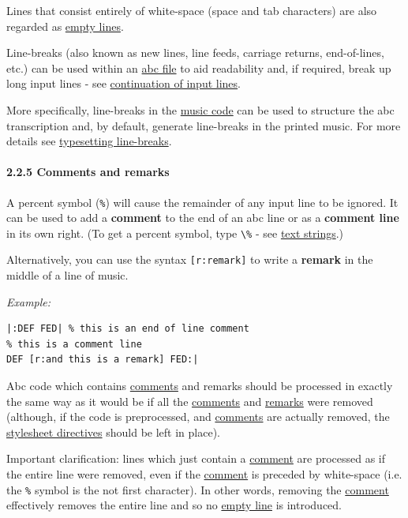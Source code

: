 \documentclass[oneside]{book}
\let\oldparagraph\paragraph
\renewcommand{\paragraph}[1]{\oldparagraph{#1}\mbox{}}
\begin{document}
Lines that consist entirely of white-space (space and tab characters)
are also regarded as \protect\hyperlink{empty_line_definition}{empty
lines}.

Line-breaks (also known as new lines, line feeds, carriage returns,
end-of-lines, etc.) can be used within an
\protect\hyperlink{abc_file_definition}{abc file} to aid readability
and, if required, break up long input lines - see
\protect\hyperlink{continuation_of_input_lines}{continuation of input
lines}.

More specifically, line-breaks in the
\protect\hyperlink{music_code_definition}{music code} can be used to
structure the abc transcription and, by default, generate line-breaks in
the printed music. For more details see
\protect\hyperlink{typesetting_line-breaks}{typesetting line-breaks}.

\hypertarget{comments_and_remarks}{\paragraph{2.2.5 Comments and
remarks}\label{comments_and_remarks}}

\href{}{}A percent symbol (\texttt{\%}) will cause the remainder of any
input line to be ignored. It can be used to add a \textbf{comment} to
the end of an abc line or as a \textbf{comment line} in its own right.
(To get a percent symbol, type \texttt{\textbackslash{}\%} - see
\protect\hyperlink{text_strings}{text strings}.)

\href{}{}Alternatively, you can use the syntax \texttt{{[}r:remark{]}}
to write a \textbf{remark} in the middle of a line of music.

\emph{Example:}

\begin{verbatim}
|:DEF FED| % this is an end of line comment
% this is a comment line
DEF [r:and this is a remark] FED:|
\end{verbatim}

Abc code which contains \protect\hyperlink{comment_definition}{comments}
and remarks should be processed in exactly the same way as it would be
if all the \protect\hyperlink{comment_definition}{comments} and
\protect\hyperlink{remark_definition}{remarks} were removed (although,
if the code is preprocessed, and
\protect\hyperlink{comment_definition}{comments} are actually removed,
the \protect\hyperlink{stylesheet_directive_definition}{stylesheet
directives} should be left in place).

Important clarification: lines which just contain a
\protect\hyperlink{comment_definition}{comment} are processed as if the
entire line were removed, even if the
\protect\hyperlink{comment_definition}{comment} is preceded by
white-space (i.e. the \texttt{\%} symbol is the not first character). In
other words, removing the
\protect\hyperlink{comment_definition}{comment} effectively removes the
entire line and so no \protect\hyperlink{empty_line_definition}{empty
line} is introduced.
\end{document}
